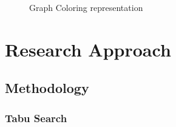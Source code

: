 \documentclass{article}
\begin{document}
\begin{figure}[htbp]
	\centering  %
	\caption{Graph Coloring representation}
	\label{Fig.main}
\end{figure}

\newpage

\section{Research Approach}
\label{sec: Research Approach}

\subsection{Methodology}

\subsubsection{Tabu Search}
\end{document}
